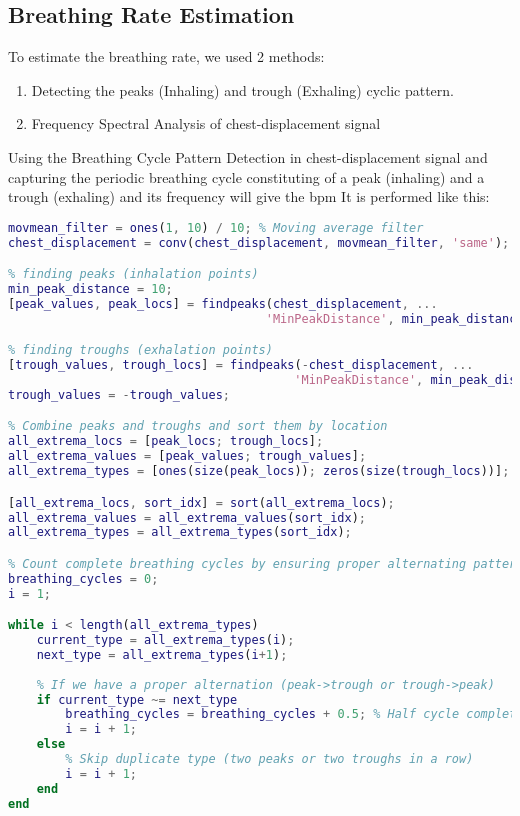 \documentclass[12pt]{article}
\begin{document}
\subsection{Breathing Rate Estimation}
To estimate the breathing rate, we used 2 methods:
\begin{enumerate}
    \item Detecting the peaks (Inhaling) and trough (Exhaling) cyclic pattern.
    \item Frequency Spectral Analysis of chest-displacement signal
\end{enumerate}
Using the Breathing Cycle Pattern Detection in chest-displacement signal and capturing the periodic breathing cycle constituting of a peak (inhaling) and a trough (exhaling) and its frequency will give the bpm It is performed like this:

\begin{lstlisting}[language=Matlab]
movmean_filter = ones(1, 10) / 10; % Moving average filter
chest_displacement = conv(chest_displacement, movmean_filter, 'same');

% finding peaks (inhalation points)
min_peak_distance = 10;
[peak_values, peak_locs] = findpeaks(chest_displacement, ...
                                    'MinPeakDistance', min_peak_distance);

% finding troughs (exhalation points)
[trough_values, trough_locs] = findpeaks(-chest_displacement, ...
                                        'MinPeakDistance', min_peak_distance);
trough_values = -trough_values;

% Combine peaks and troughs and sort them by location
all_extrema_locs = [peak_locs; trough_locs];
all_extrema_values = [peak_values; trough_values];
all_extrema_types = [ones(size(peak_locs)); zeros(size(trough_locs))]; % 1 for peaks, 0 for troughs

[all_extrema_locs, sort_idx] = sort(all_extrema_locs);
all_extrema_values = all_extrema_values(sort_idx);
all_extrema_types = all_extrema_types(sort_idx);

% Count complete breathing cycles by ensuring proper alternating pattern
breathing_cycles = 0;
i = 1;

while i < length(all_extrema_types)
    current_type = all_extrema_types(i);
    next_type = all_extrema_types(i+1);
    
    % If we have a proper alternation (peak->trough or trough->peak)
    if current_type ~= next_type
        breathing_cycles = breathing_cycles + 0.5; % Half cycle completed
        i = i + 1;
    else
        % Skip duplicate type (two peaks or two troughs in a row)
        i = i + 1;
    end
end
\end{lstlisting}
\end{document}
